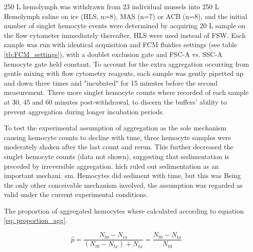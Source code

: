 250 \micro L hemolymph was withdrawn from 23 individual mussels into 250 \micro L Hemolymph saline on ice (HLS, n=8), MAS (n=7) or ACB (n=8), and the initial number of singlet hemocyte events were determined by acquiring 20 \micro L sample on the flow cytometer immediately thereafter. HLS were used instead of FSW. Each sample was run with identical acquisition and FCM fluidics settings (see table \ref{tb:FCM_settings}), with a doublet exclusion gate and FSC-A vs. SSC-A hemocyte gate held constant. To account for the extra aggregation occurring from gentle mixing with flow cytometry reagents, each sample was gently pipetted up and down three times and "incubated" for 15 minutes before the second measurement. Three more singlet hemocyte counts where recorded of each sample at 30, 45 and 60 minutes post-withdrawal, to discern the buffers' ability to prevent aggregation during longer incubation periods.

To test the experimental assumption of aggregation as the sole mechanism causing
hemocyte counts to decline with time, three hemocyte samples were moderately shaken after the last count and rerun. This further decreased the singlet hemocyte counts (data not shown), suggesting that sedimentation is preceded by irreversible aggregation. hich ruled out sedimentation as an important mechani. sm. Hemocytes did sediment with time, but this was Being the only other conceivable mechanism involved, the assumption was regarded as valid under the current experimental conditions.

The proportion of aggregated hemocytes where calculated according to equation \ref{eq: proportion_agg}.

\begin{equation}
    \label{eq: proportion_agg}
    \hat{p} = \dfrac{N_{t0} - N_{tx}}{(N_{t0} - N_{tx}) + N_{tx}} = \dfrac{N_{t0} - N_{tx}}{N_{t0}}
\end{equation}

